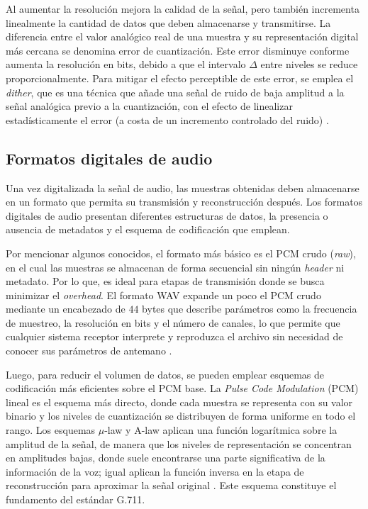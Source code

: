 Al aumentar la resolución mejora la calidad de la señal, pero también incrementa linealmente la cantidad de datos que deben almacenarse y transmitirse.
La diferencia entre el valor analógico real de una muestra y su representación digital más cercana se denomina error de cuantización.
Este error disminuye conforme aumenta la resolución en bits, debido a que el intervalo $\Delta$ entre niveles se reduce proporcionalmente.
Para mitigar el efecto perceptible de este error, se emplea el \textit{dither}, que es una técnica que añade una señal de ruido de baja amplitud a la señal analógica previo a la cuantización, con el efecto de linealizar estadísticamente el error (a costa de un incremento controlado del ruido) \cite{pohlmann2005}.

\subsection{Formatos digitales de audio}

Una vez digitalizada la señal de audio, las muestras obtenidas deben almacenarse en un formato que permita su transmisión y reconstrucción después.
Los formatos digitales de audio presentan diferentes estructuras de datos, la presencia o ausencia de metadatos y el esquema de codificación que emplean.

Por mencionar algunos conocidos, el formato más básico es el PCM crudo (\textit{raw}), en el cual las muestras se almacenan de forma secuencial sin ningún \textit{header} ni metadato.
Por lo que, es ideal para etapas de transmisión donde se busca minimizar el \textit{overhead}.
El formato WAV expande un poco el PCM crudo mediante un encabezado de $44$ bytes que describe parámetros como la frecuencia de muestreo, la resolución en bits y el número de canales, lo que permite que cualquier sistema receptor interprete y reproduzca el archivo sin necesidad de conocer sus parámetros de antemano \cite{tanenbaum2011}.

Luego, para reducir el volumen de datos, se pueden emplear esquemas de codificación más eficientes sobre el PCM base.
La \textit{Pulse Code Modulation} (PCM) lineal es el esquema más directo, donde cada muestra se representa con su valor binario y los niveles de cuantización se distribuyen de forma uniforme en todo el rango.
Los esquemas $\mu$-law y A-law aplican una función logarítmica sobre la amplitud de la señal, de manera que los niveles de representación se concentran en amplitudes bajas, donde suele encontrarse una parte significativa de la información de la voz; igual aplican la función inversa en la etapa de reconstrucción para aproximar la señal original \cite{pohlmann2005, li2014, tanenbaum2011}.
Este esquema constituye el fundamento del estándar G.711.

